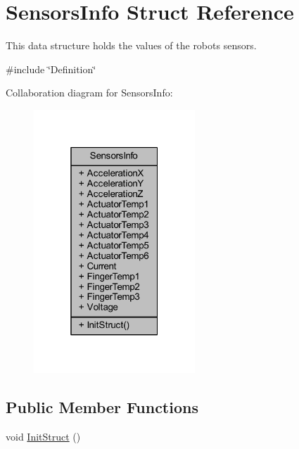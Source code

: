 \hypertarget{structSensorsInfo}{}\section{Sensors\+Info Struct Reference}
\label{structSensorsInfo}


This data structure holds the values of the robot\textquotesingle{}s sensors.  




{\ttfamily \#include \char`\"{}Definition\char`\"{}}



Collaboration diagram for Sensors\+Info\+:
\nopagebreak
\begin{figure}[H]
\begin{center}
\leavevmode
\includegraphics[width=172pt]{d2/d88/structSensorsInfo__coll__graph}
\end{center}
\end{figure}
\subsection*{Public Member Functions}
\begin{DoxyCompactItemize}
\item 
void \hyperlink{structSensorsInfo_a321b3a120733f8a2a317422cfe8e4869}{Init\+Struct} ()
\end{DoxyCompactItemize}
